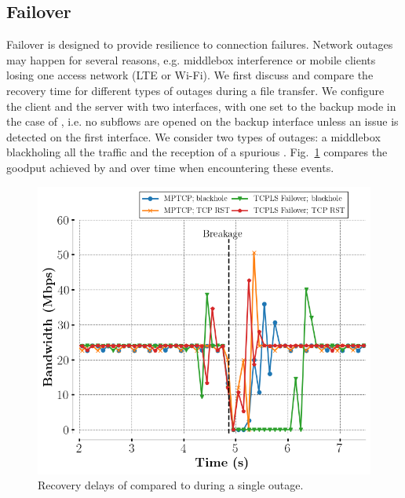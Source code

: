 \subsection{Failover}
\label{sec:eval_failover}

Failover is designed to provide resilience to \tcpls connection
failures. Network outages may happen
for several reasons, e.g. middlebox interference or mobile clients losing
one access network (LTE or Wi-Fi). 
We first discuss and compare the recovery time
for different types of outages during a file transfer. We configure the client 
and the server with two interfaces, with one set to the 
backup mode in the case of \mptcp, i.e. no subflows are opened on the backup 
interface unless an issue is detected on the first interface. 
We consider two 
types of outages: a middlebox blackholing all the traffic and the reception of a 
spurious \rst.
Fig.~\ref{fig:recovery}
compares the goodput achieved by \mptcp and \tcpls over time when encountering 
these events.

\begin{figure}[!t]
  \begin{center}
    \includegraphics[width=.8\columnwidth]{figures/breakage_analysis.png}
  \end{center}
\vspace{-0.5cm}
  \caption{Recovery delays of \tcpls compared to \mptcp during a single outage.}
  \label{fig:recovery}
\end{figure}

